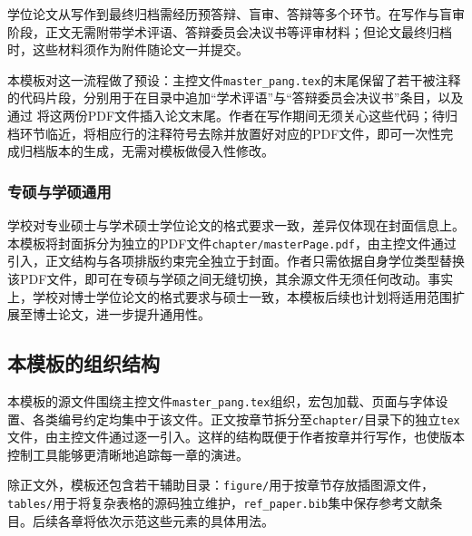 学位论文从写作到最终归档需经历预答辩、盲审、答辩等多个环节。在写作与盲审阶段，正文无需附带学术评语、答辩委员会决议书等评审材料；但论文最终归档时，这些材料须作为附件随论文一并提交。

本模板对这一流程做了预设：主控文件\texttt{master\_pang.tex}的末尾保留了若干被注释的代码片段，分别用于在目录中追加“学术评语”与“答辩委员会决议书”条目，以及通过\verb|| 将这两份PDF文件插入论文末尾。作者在写作期间无须关心这些代码；待归档环节临近，将相应行的注释符号去除并放置好对应的PDF文件，即可一次性完成归档版本的生成，无需对模板做侵入性修改。

\subsubsection{专硕与学硕通用}

学校对专业硕士与学术硕士学位论文的格式要求一致，差异仅体现在封面信息上。本模板将封面拆分为独立的PDF文件\texttt{chapter/masterPage.pdf}，由主控文件通过\verb||引入，正文结构与各项排版约束完全独立于封面。作者只需依据自身学位类型替换该PDF文件，即可在专硕与学硕之间无缝切换，其余源文件无须任何改动。事实上，学校对博士学位论文的格式要求与硕士一致，本模板后续也计划将适用范围扩展至博士论文，进一步提升通用性。

\subsection{本模板的组织结构}

本模板的源文件围绕主控文件\texttt{master\_pang.tex}组织，宏包加载、页面与字体设置、各类编号约定均集中于该文件。正文按章节拆分至\texttt{chapter/}目录下的独立\texttt{tex}文件，由主控文件通过\verb||逐一引入。这样的结构既便于作者按章并行写作，也使版本控制工具能够更清晰地追踪每一章的演进。

除正文外，模板还包含若干辅助目录：\texttt{figure/}用于按章节存放插图源文件，\texttt{tables/}用于将复杂表格的源码独立维护，\texttt{ref\_paper.bib}集中保存参考文献条目。后续各章将依次示范这些元素的具体用法。
